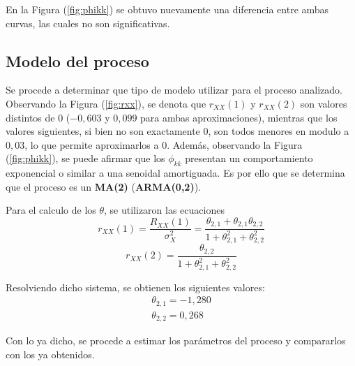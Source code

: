 En la Figura (\ref{fig:phikk}) se obtuvo nuevamente una diferencia entre ambas curvas, las cuales no son significativas.

\subsection{Modelo del proceso}
\label{subsec:modelo}

Se procede a determinar que tipo de modelo utilizar para el proceso analizado. Observando la Figura (\ref{fig:rxx}), se denota que $r_{XX}(1)$ y $r_{XX}(2)$ son valores distintos de 0 ($-0,603$ y $0,099$ para ambas aproximaciones), mientras que los valores siguientes, si bien no son exactamente 0, son todos menores en modulo a $0,03$, lo que permite aproximarlos a 0. Además, observando la Figura (\ref{fig:phikk}), se puede afirmar que los $\phi_{kk}$ presentan un comportamiento exponencial o similar a una senoidal amortiguada. Es por ello que se determina que el proceso es un \textbf{MA(2)} (\textbf{ARMA(0,2)}).

Para el calculo de los $\theta$, se utilizaron las ecuaciones
\begin{equation}
	r_{XX}(1) = \frac{R_{XX}(1)}{\sigma_X^2} = \frac{\theta_{2,1} + \theta_{2,1} \theta_{2,2}}{1 +\theta_{2,1}^2 + \theta_{2,2}^2}
\end{equation}
\begin{equation}
	r_{XX}(2) = \frac{\theta_{2,2}}{1 +\theta_{2,1}^2 + \theta_{2,2}^2}
\end{equation}

Resolviendo dicho sistema, se obtienen los siguientes valores:
\begin{equation}
\begin{gathered}
	\theta_{2,1} = -1,280	\\
	\theta_{2,2} = 0,268	
\end{gathered}
\end{equation}

Con lo ya dicho, se procede a estimar los parámetros del proceso y compararlos con los ya obtenidos.

